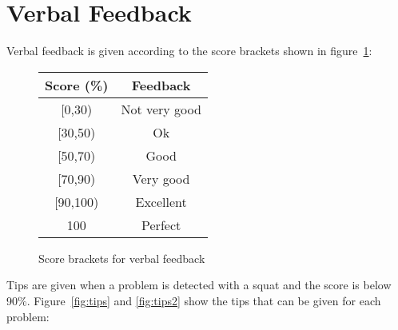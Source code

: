 \section{Verbal Feedback}
\label{sec:appendix_feedback}

Verbal feedback is given according to the score brackets shown in figure~\ref{fig:score_brackets}:

\begin{figure}[H]
    \centering
	\begin{tabular}{ | c | c | }
		\hline
	    \textbf{Score (\%)} & \textbf{Feedback}\\ \hline
	    [0,30) & Not very good \\ \hline
		[30,50) & Ok \\ \hline
		[50,70) & Good \\ \hline
		[70,90) & Very good \\ \hline
		[90,100) & Excellent \\ \hline
		100 & Perfect \\ \hline
	\end{tabular}
\caption{Score brackets for verbal feedback}
\label{fig:score_brackets}
\end{figure}

Tips are given when a problem is detected with a squat and the score is below 90\%. Figure~\ref{fig:tips} and \ref{fig:tips2} show the tips that can be given for each problem:

